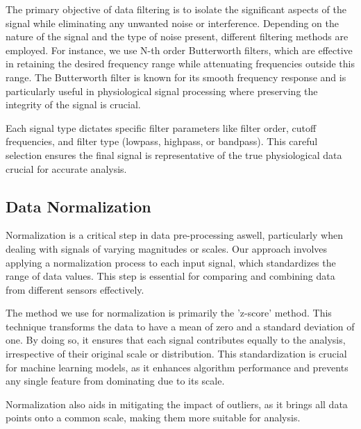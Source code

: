 The primary objective of data filtering is to isolate the significant aspects of the signal while eliminating any unwanted noise or interference. Depending on the nature of the signal and the type of noise present, different filtering methods are employed. For instance, we use N-th order Butterworth filters, which are effective in retaining the desired frequency range while attenuating frequencies outside this range. The Butterworth filter is known for its smooth frequency response and is particularly useful in physiological signal processing where preserving the integrity of the signal is crucial.

Each signal type dictates specific filter parameters like filter order, cutoff frequencies, and filter type (lowpass, highpass, or bandpass). This careful selection ensures the final signal is representative of the true physiological data crucial for accurate analysis.

\subsection*{Data Normalization}
Normalization is a critical step in data pre-processing aswell, particularly when dealing with signals of varying magnitudes or scales. Our approach involves applying a normalization process to each input signal, which standardizes the range of data values. This step is essential for comparing and combining data from different sensors effectively.

The method we use for normalization is primarily the 'z-score' method. This technique transforms the data to have a mean of zero and a standard deviation of one. By doing so, it ensures that each signal contributes equally to the analysis, irrespective of their original scale or distribution. This standardization is crucial for machine learning models, as it enhances algorithm performance and prevents any single feature from dominating due to its scale.

Normalization also aids in mitigating the impact of outliers, as it brings all data points onto a common scale, making them more suitable for analysis.

